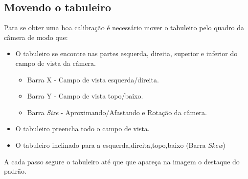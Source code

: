 \subsection{Movendo o tabuleiro}

Para se obter uma boa calibração é necessário mover o tabuleiro pelo quadro da câmera de modo que:

\begin{itemize}
	\item{O tabuleiro se encontre nas partes esquerda, direita, superior e inferior do campo de vista da câmera.}
	\begin{itemize}
		\item{Barra X - Campo de vista esquerda/direita.}
		\item{Barra Y - Campo de vista topo/baixo.}
		\item{Barra \textit{Size} - Aproximando/Afastando e Rotação da câmera.}
	\end{itemize}
	\item{O tabuleiro preencha todo o campo de vista.}
	\item{O tabuleiro inclinado para a esquerda,direita,topo,baixo (Barra \textit{Skew})}
\end{itemize}

A cada passo segure o tabuleiro até que que apareça na imagem o destaque do padrão.

